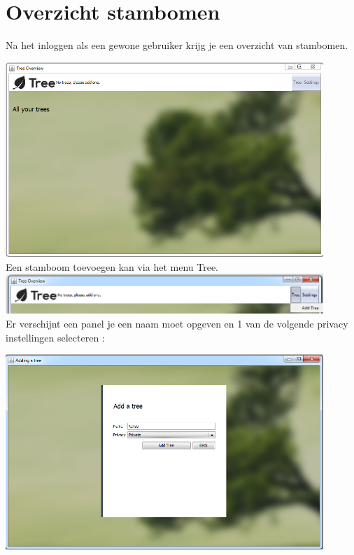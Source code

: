 \documentclass[pdftex,a4paper,12pt,twoside]{report}
\begin{document}
\chapter{Overzicht stambomen}\label{ch:preface}
Na het inloggen als een gewone gebruiker krijg je een overzicht van stambomen.

\includegraphics[width=12cm]{images/user_treeoverview.png}\\[.5cm]

Een stamboom toevoegen kan via het menu Tree.
\includegraphics[width=12cm]{images/tree_add.png}\\[.5cm]

Er verschijnt een panel je een naam moet opgeven en 1 van de volgende privacy instellingen selecteren :

\includegraphics[width=12cm]{images/add_tree.png}\\[.5cm]
\end{document}
